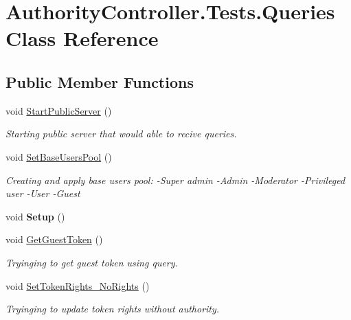 \hypertarget{class_authority_controller_1_1_tests_1_1_queries}{}\section{Authority\+Controller.\+Tests.\+Queries Class Reference}
\label{class_authority_controller_1_1_tests_1_1_queries}
\subsection*{Public Member Functions}
\begin{DoxyCompactItemize}
\item 
void \mbox{\hyperlink{class_authority_controller_1_1_tests_1_1_queries_a1e0a184a21e8260f3483b3f9a8c816f5}{Start\+Public\+Server}} ()
\begin{DoxyCompactList}\small\item\em Starting public server that would able to recive queries. \end{DoxyCompactList}\item 
void \mbox{\hyperlink{class_authority_controller_1_1_tests_1_1_queries_a2e5cb3ec94045a037d0854d9aea11323}{Set\+Base\+Users\+Pool}} ()
\begin{DoxyCompactList}\small\item\em Creating and apply base users pool\+: -\/\+Super admin -\/\+Admin -\/\+Moderator -\/\+Privileged user -\/\+User -\/\+Guest \end{DoxyCompactList}\item 
\mbox{\label{class_authority_controller_1_1_tests_1_1_queries_af8f75f7ae081367f731cca0708cb1480}} 
void {\bfseries Setup} ()
\item 
void \mbox{\hyperlink{class_authority_controller_1_1_tests_1_1_queries_a73aecfeff3ab2ef348cbecb67d60fe49}{Get\+Guest\+Token}} ()
\begin{DoxyCompactList}\small\item\em Tryinging to get guest token using query. \end{DoxyCompactList}\item 
void \mbox{\hyperlink{class_authority_controller_1_1_tests_1_1_queries_a803981626447ef436d7461ee278eb052}{Set\+Token\+Rights\+\_\+\+No\+Rights}} ()
\begin{DoxyCompactList}\small\item\em Tryinging to update token rights without authority. \end{DoxyCompactList}\item 

\end{DoxyCompactItemize}
